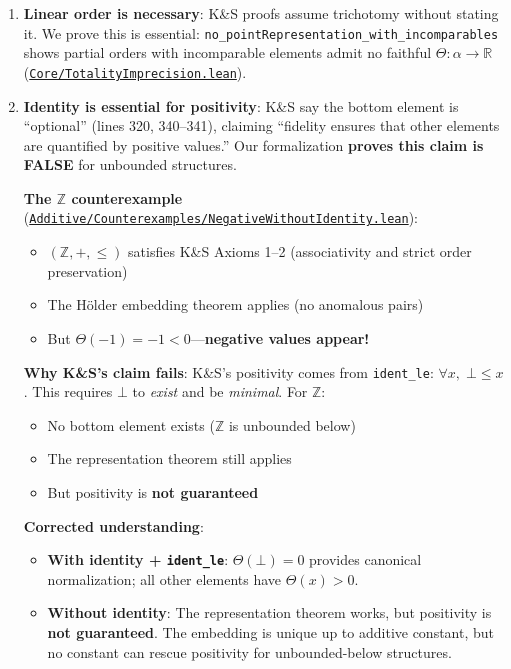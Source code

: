 \documentclass[11pt]{article}
\theoremstyle{definition}
\theoremstyle{remark}
\begin{document}
\begin{enumerate}
\item \textbf{Linear order is necessary}: K\&S proofs assume trichotomy without stating it.
We prove this is essential: \texttt{no\_pointRepresentation\_with\_incomparables} shows
partial orders with incomparable elements admit no faithful $\Theta : \alpha \to \mathbb{R}$
(\href{https://github.com/zariuq/ks-foundations-of-inference/blob/main/KnuthSkilling/Core/TotalityImprecision.lean}{\texttt{Core/TotalityImprecision.lean}}).

\item \textbf{Identity is essential for positivity}: K\&S say the bottom element is ``optional'' (lines 320, 340--341),
claiming ``fidelity ensures that other elements are quantified by positive values.''
Our formalization \textbf{proves this claim is FALSE} for unbounded structures.

\textbf{The $\mathbb{Z}$ counterexample} (\href{https://github.com/zariuq/ks-foundations-of-inference/blob/main/KnuthSkilling/Additive/Counterexamples/NegativeWithoutIdentity.lean}{\texttt{Additive/Counterexamples/NegativeWithoutIdentity.lean}}):
\begin{itemize}
\item $(\mathbb{Z}, +, \leq)$ satisfies K\&S Axioms 1--2 (associativity and strict order preservation)
\item The Hölder embedding theorem applies (no anomalous pairs)
\item But $\Theta(-1) = -1 < 0$---\textbf{negative values appear!}
\end{itemize}

\textbf{Why K\&S's claim fails}: K\&S's positivity comes from \texttt{ident\_le}: $\forall x,\; \bot \leq x$.
This requires $\bot$ to \emph{exist} and be \emph{minimal}. For $\mathbb{Z}$:
\begin{itemize}
\item No bottom element exists ($\mathbb{Z}$ is unbounded below)
\item The representation theorem still applies
\item But positivity is \textbf{not guaranteed}
\end{itemize}

\textbf{Corrected understanding}:
\begin{itemize}
\item \textbf{With identity + \texttt{ident\_le}}: $\Theta(\bot) = 0$ provides canonical normalization;
      all other elements have $\Theta(x) > 0$.
\item \textbf{Without identity}: The representation theorem works, but positivity is
      \textbf{not guaranteed}. The embedding is unique up to additive constant, but
      no constant can rescue positivity for unbounded-below structures.
\end{itemize}


\end{enumerate}
\end{document}
